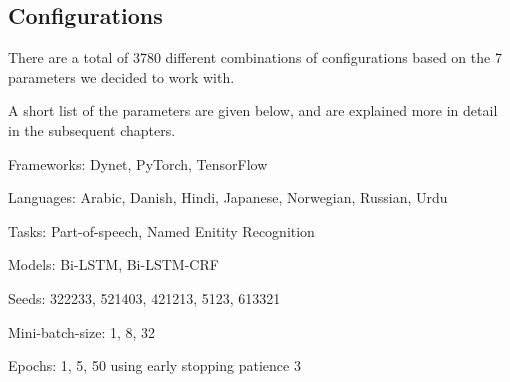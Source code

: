
\subsection{Configurations}

There are a total of 3780 different combinations of configurations based on the
7 parameters we decided to work with. 

A short list of the parameters are given below, and are explained more in detail
in the subsequent chapters.

Frameworks: Dynet, PyTorch, TensorFlow

Languages: Arabic, Danish, Hindi, Japanese, Norwegian, Russian, Urdu

Tasks: Part-of-speech, Named Enitity Recognition

Models: Bi-LSTM, Bi-LSTM-CRF

Seeds: 322233, 521403, 421213, 5123, 613321

Mini-batch-size: 1, 8, 32

Epochs: 1, 5, 50 using early stopping patience 3



